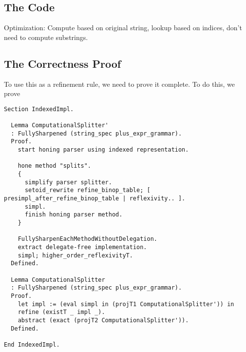  \subsection{The Code}
 
    Optimization: Compute based on original string, lookup based on indices, don't need to compute substrings.
  \subsection{The Correctness Proof}
    To use this as a refinement rule, we need to prove it complete.  To do this, we prove 

 

\begin{verbatim}
Section IndexedImpl.

  Lemma ComputationalSplitter'
  : FullySharpened (string_spec plus_expr_grammar).
  Proof.
    start honing parser using indexed representation.

    hone method "splits".
    {
      simplify parser splitter.
      setoid_rewrite refine_binop_table; [ presimpl_after_refine_binop_table | reflexivity.. ].
      simpl.
      finish honing parser method.
    }

    FullySharpenEachMethodWithoutDelegation.
    extract delegate-free implementation.
    simpl; higher_order_reflexivityT.
  Defined.

  Lemma ComputationalSplitter
  : FullySharpened (string_spec plus_expr_grammar).
  Proof.
    let impl := (eval simpl in (projT1 ComputationalSplitter')) in
    refine (existT _ impl _).
    abstract (exact (projT2 ComputationalSplitter')).
  Defined.

End IndexedImpl.

\end{verbatim}

